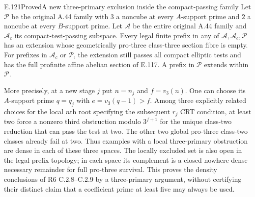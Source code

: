 \begin{result}{E.121}{Proved}{A new three-primary exclusion inside the compact-passing family}
Let $\mathscr P$ be the original A.44 family with $3$ a noncube
at every $A$-support prime and $2$ a noncube at every $B$-support
prime. Let $\mathscr A$ be the entire original A.44 family and
$\mathscr A_c$ its compact-test-passing subspace. Every legal
finite prefix in any of $\mathscr A,\mathscr A_c,\mathscr P$ has an extension
whose geometrically pro-three class-three section fibre is empty.
For prefixes in $\mathscr A_c$ or $\mathscr P$, the extension
still passes all compact elliptic tests and has the full profinite
affine abelian section of E.117. A prefix in $\mathscr P$ extends
within $\mathscr P$.

More precisely, at a new stage $j$ put $n=n_j$ and $f=v_3(n)$.
One can choose its $A$-support prime $q=q_j$ with
$e=v_3(q-1)>f$. Among three explicitly related choices for the
local $n$th root specifying the subsequent $r_j$ CRT condition,
at least two force a nonzero third obstruction modulo $3^{f+1}$
for the unique class-two reduction that can pass the test at two.
The other two global pro-three class-two classes already fail at
two. Thus examples with a local three-primary obstruction are
dense in each of these three spaces. The locally excluded set is
also open in the legal-prefix topology; in each space its complement
is a closed nowhere dense necessary remainder for full pro-three
survival. This proves the density conclusions of R6 C.2.8--C.2.9
by a three-primary argument, without certifying their distinct
claim that a coefficient prime at least five may always be used.
\end{result}
